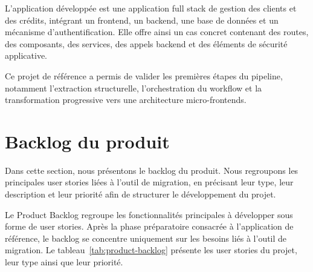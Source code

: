 L'application développée est une application full stack de gestion des clients et des crédits, intégrant un frontend, un backend, une base de données et un mécanisme d'authentification. Elle offre ainsi un cas concret contenant des routes, des composants, des services, des appels backend et des éléments de sécurité applicative.

Ce projet de référence a permis de valider les premières étapes du pipeline, notamment l'extraction structurelle, l'orchestration du workflow et la transformation progressive vers une architecture micro-frontends.

\section{Backlog du produit}

Dans cette section, nous présentons le backlog du produit. Nous regroupons les principales user stories liées à l'outil de migration, en précisant leur type, leur description et leur priorité afin de structurer le développement du projet.

Le Product Backlog regroupe les fonctionnalités principales à développer sous forme de user stories. Après la phase préparatoire consacrée à l'application de référence, le backlog se concentre uniquement sur les besoins liés à l'outil de migration. Le tableau~\ref{tab:product-backlog} présente les user stories du projet, leur type ainsi que leur priorité.

